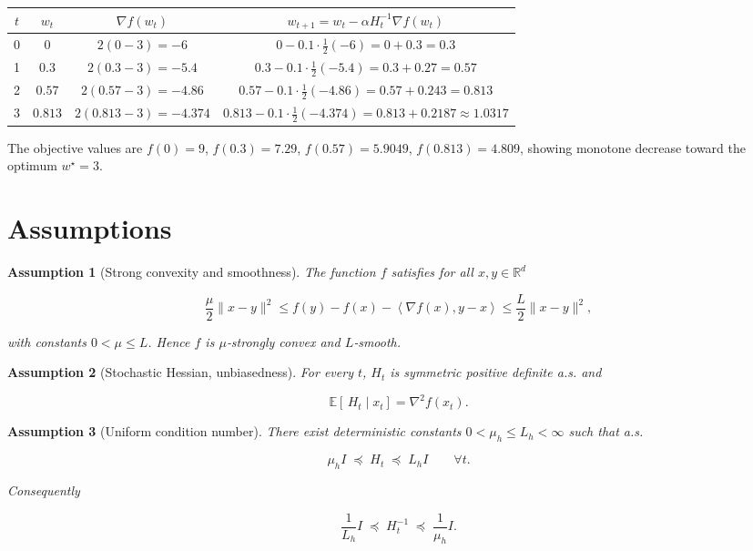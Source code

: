 \documentclass{article}
\newtheorem{assumption}{Assumption}
\newcommand{\E}{\mathbb{E}}
\newcommand{\ip}[2]{\left\langle #1,#2\right\rangle}
\newcommand{\R}{\mathbb{R}}
\begin{document}
\begin{center}
\begin{tabular}{c|c|c|c}
$t$ & $w_t$ & $\nabla f(w_t)$ & $w_{t+1}=w_t-\alpha H_t^{-1}\nabla f(w_t)$\\ \hline
0 & $0$ & $2(0-3)=-6$ & $0-0.1\cdot\frac{1}{2}(-6)=0+0.3=0.3$ \\
1 & $0.3$ & $2(0.3-3)=-5.4$ & $0.3-0.1\cdot\frac{1}{2}(-5.4)=0.3+0.27=0.57$ \\
2 & $0.57$ & $2(0.57-3)=-4.86$ & $0.57-0.1\cdot\frac{1}{2}(-4.86)=0.57+0.243=0.813$ \\
3 & $0.813$ & $2(0.813-3)=-4.374$ & $0.813-0.1\cdot\frac{1}{2}(-4.374)=0.813+0.2187\approx1.0317$
\end{tabular}
\end{center}

The objective values are $f(0)=9$, $f(0.3)=7.29$, $f(0.57)=5.9049$, $f(0.813)=4.809$, showing monotone decrease toward the optimum $w^{\star}=3$.

\newpage
\section*{Assumptions}
\begin{assumption}[Strong convexity and smoothness]\label{ass:strongsmooth}
The function $f$ satisfies for all $x,y\in\R^{d}$  

\[
\frac{\mu}{2}\|x-y\|^{2}\le f(y)-f(x)-\ip{\nabla f(x)}{y-x}
\le\frac{L}{2}\|x-y\|^{2},
\]

with constants $0<\mu\le L$.  Hence $f$ is $\mu$‑strongly convex and $L$‑smooth.
\end{assumption}

\begin{assumption}[Stochastic Hessian, unbiasedness]\label{ass:unbiased}
For every $t$, $H_t$ is symmetric positive definite a.s. and  

\[
\E\!\left[\,H_t\mid x_t\right]=\nabla^{2}f(x_t).
\]
\end{assumption}

\begin{assumption}[Uniform condition number]\label{ass:condnum}
There exist deterministic constants $0<\mu_h\le L_h<\infty$ such that a.s.  

\[
\mu_h I \;\preceq\; H_t\;\preceq\;L_h I\qquad\forall t .
\tag{2}
\]

Consequently  

\[
\frac{1}{L_h}I\;\preceq\;H_t^{-1}\;\preceq\;\frac{1}{\mu_h}I .
\tag{3}
\]
\end{assumption}
\end{document}
